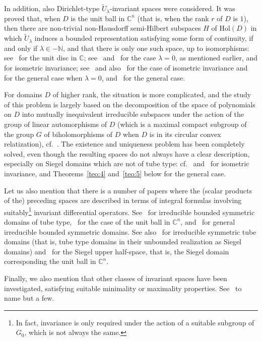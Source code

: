 \documentclass[10.5pt,reqno]{amsart}
\newcommand{\Hol}{\mathrm{Hol}}
\newcommand{\N}{\mathds{N}}
\newcommand{\C}{\mathds{C}}
\begin{document}
In addition, also Dirichlet-type $\widetilde U_\lambda$-invariant spaces were considered. It was proved that, when $D$ is the unit ball in $\C^n$ (that is, when the rank $r$ of $D$ is $1$), then there are non-trivial non-Hausdorff semi-Hilbert subspaces $H$ of $\Hol(D)$ in which $\widetilde U_\lambda$ induces a bounded representation satisfying some form of continuity, if and only if $\lambda\in - \N$, and that there is only one such space, up to isomorphisms: see~\cite{Peetre2} for the unit disc in $\C$; see~\cite{Peetre} and~\cite{Zhu}  for the case $\lambda=0$, as mentioned earlier, and for isometric invariance; see~\cite[Theorems 2 and 5]{ArazyFisher2} and also~\cite[Theorem 5.2]{Arazy} for the case of isometric invariance and for the general case when $\lambda=0$, and~\cite[Theorem 5.3]{Rango1} for the general case.

For domains $D$ of higher rank, the situation is  more complicated, and the study of this problem is largely based on the  decomposition of the space of polynomials on $D$ into mutually inequivalent irreducible subspaces under the action of the group of linear automorphisms of $D$ (which is a maximal compact subgroup of the group  $G$ of biholomorphisms of $D$ when $D$ is in its circular convex relatization), cf.~\cite{FarautKoranyi2}. The existence and uniqueness problem has been  completely solved, even though the resulting spaces do  not always have a clear description, especially on Siegel domains which are not of tube type: cf.~\cite{ArazyFisher3} and~\cite[Theorem 5.2]{Arazy} for isometric invariance, and Theorems~\ref{teo:4} and~\ref{teo:5} below for the general case. 

Let us also mention that there is a number of papers where  the (scalar products of the) preceding spaces are described in terms of integral formulas involving suitably\footnote{In fact, invariance is only required under the action of a suitable subgroup of $G_0$, which is not always the same.} invariant differential operators. See~\cite{Arazy2,ArazyUpmeier,ArazyUpmeier2} for irreducible bounded symmetric domains of tube type,~\cite{Peloso,Arazy3} for the case of the unit ball in $\C^n$, and~\cite{Yan} for general irreducible bounded symmetric domains. See also~\cite{Garrigos} for irreducible symmetric tube domains (that is, tube type domains in their unbounded  realization as Siegel domains) and~\cite{Arcozzietal} for the Siegel upper half-space, that is, the Siegel domain corresponding the unit ball in $\C^n$. 

Finally, we also mention that other classes of invariant spaces have been investigated, satisfying suitable minimality or maximality properties. See~\cite{ArazyFisher4,Peloso,ArazyFisherPeetre,Zhu,ArazyUpmeier3,AlemanMas,Survey} to name but a few.
\end{document}
